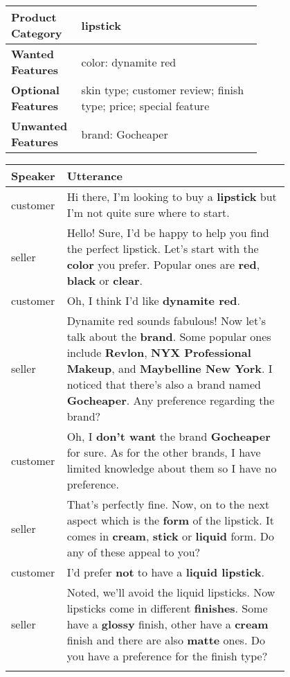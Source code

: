 \begin{table*}[t]
\small
\begin{center}
    \begin{tabular}{l p{0.72\linewidth} }
    \hline
    \textbf{Product Category} & lipstick \\ \hline
    \textbf{Wanted Features} & color: dynamite red \\ \hline
    \textbf{Optional Features} & skin type; customer review; finish type; price; special feature \\ \hline
    \textbf{Unwanted Features} & brand: Gocheaper \\ \hline 
    \end{tabular}
    \begin{tabular}{l p{0.8\linewidth} }
    \hline
    \textbf{Speaker} & \textbf{Utterance} \\
    \hline
    customer& Hi there, I'm looking to buy a \textbf{lipstick} but I'm not quite sure where to start. \\\hdashline
    seller& Hello! Sure, I'd be happy to help you find the perfect lipstick. Let's start with the \textbf{color} you prefer. Popular ones are \textbf{red}, \textbf{black} or \textbf{clear}.\\\hdashline
    customer& Oh, I think I'd like \textbf{dynamite red}. \\\hdashline
    seller& Dynamite red sounds fabulous! Now let's talk about the \textbf{brand}. Some popular ones include \textbf{Revlon}, \textbf{NYX Professional Makeup}, and \textbf{Maybelline New York}. I noticed that there's also a brand named \textbf{Gocheaper}. Any preference regarding the brand?\\\hdashline
    customer& Oh, I \textbf{don't want} the brand \textbf{Gocheaper} for sure. As for the other brands, I have limited knowledge about them so I have no preference.\\\hdashline
    seller& That's perfectly fine. Now, on to the next aspect which is the \textbf{form} of the lipstick. It comes in \textbf{cream}, \textbf{stick} or \textbf{liquid} form. Do any of these appeal to you?\\\hdashline
    customer&  I'd prefer \textbf{not} to have a \textbf{liquid lipstick}. \\\hdashline
    seller& Noted, we'll avoid the liquid lipsticks. Now lipsticks come in different \textbf{finishes}. Some have a \textbf{glossy} finish, other have a \textbf{cream} finish and there are also \textbf{matte} ones. Do you have a preference for the finish type?\\\hdashline

\end{tabular}
\end{center}
\end{table*}

